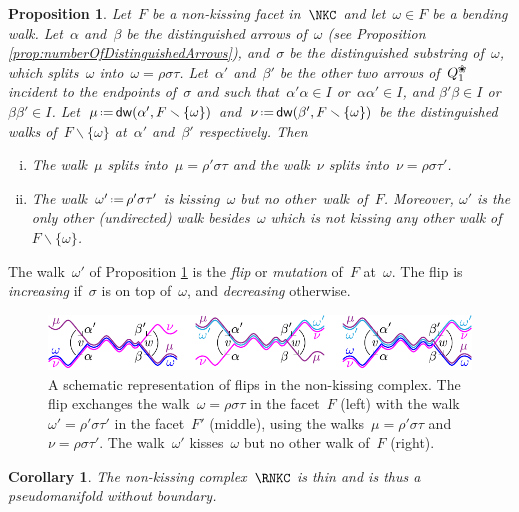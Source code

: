 \documentclass{amsart}
\newtheorem{corollary}[theorem]{Corollary}
\newtheorem{proposition}[theorem]{Proposition}
\theoremstyle{definition}
\newcommand{\ssm}{\smallsetminus} %
\newcommand{\eqdef}{\mbox{\,\raisebox{0.2ex}{\scriptsize\ensuremath{\mathrm:}}\ensuremath{=}\,}} %
\newcommand{\darkblue}{\color{darkblue}} %
\newcommand{\defn}[1]{\textsl{\darkblue #1}} %
\newcommand{\blossom}{^\text{\ding{96}}} %
\newcommand{\distinguishedWalk}[2]{\mathsf{dw}(#1,#2)} %
\begin{document}
\begin{proposition}
\label{prop:flip}
Let~$F$ be a non-kissing facet in~$\NKC$ and let~$\omega \in F$ be a bending walk.
Let~$\alpha$ and~$\beta$ be the distinguished arrows of~$\omega$ (see Proposition \ref{prop:numberOfDistinguishedArrows}), and~$\sigma$ be the distinguished substring of~$\omega$, which splits~$\omega$ into~$\omega = \rho \sigma \tau$.
Let~$\alpha'$ and~$\beta'$ be the other two arrows of~$Q_1\blossom$ incident to the endpoints of~$\sigma$ and such that~$\alpha'\alpha \in I$ or~$\alpha\alpha' \in I$, and $\beta'\beta \in I$ or~$\beta\beta' \in I$.
Let~$\mu \eqdef \distinguishedWalk{\alpha'}{F \ssm \{\omega\}}$ and~$\nu \eqdef \distinguishedWalk{\beta'}{F \ssm \{\omega\}}$ be the distinguished walks of~$F \ssm \{\omega\}$ at~$\alpha'$ and~$\beta'$ respectively.
Then
\begin{enumerate}[(i)]
\item The walk~$\mu$ splits into~$\mu = \rho' \sigma \tau$ and the walk~$\nu$ splits into~$\nu = \rho \sigma \tau'$.
\item The walk~$\omega' \eqdef \rho' \sigma \tau'$ is kissing~$\omega$ but no other~walk~of~$F$. Moreover, $\omega'$ is the only other (undirected) walk besides~$\omega$ which is not kissing any other walk of~$F \ssm \{\omega\}$.
\end{enumerate}
\end{proposition}
The walk~$\omega'$ of Proposition \ref{prop:flip} is the \defn{flip} or \defn{mutation} of~$F$ at~$\omega$.
The flip is \defn{increasing} if~$\sigma$ is on top of~$\omega$, and \defn{decreasing} otherwise.

\begin{figure}[t]
	\capstart
	\centerline{\includegraphics[scale=1]{flip1}}
	\caption{A schematic representation of flips in the non-kissing complex. The flip exchanges the walk~$\omega = \rho \sigma \tau$ in the facet~$F$ (left) with the walk~$\omega' = \rho' \sigma \tau'$ in the facet~$F'$ (middle), using the walks~$\mu = \rho' \sigma \tau$ and~$\nu = \rho \sigma \tau'$. The walk~$\omega'$ kisses~$\omega$ but no other walk of~$F$ (right).}
	\label{fig:flip1}
\end{figure}

\begin{corollary}
\label{coro:thin}
The non-kissing complex~$\RNKC$ is thin and is thus a pseudomanifold without boundary.
\end{corollary}
\end{document}
